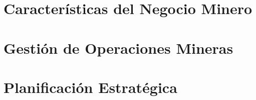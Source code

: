 \documentclass[10pt]{beamer}
\begin{document}
\section{Características del Negocio Minero}

\section{Gestión de Operaciones Mineras}

\section{Planificación Estratégica}
\end{document}
